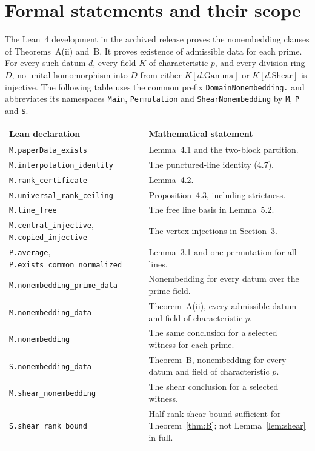 \documentclass[11pt,a4paper]{article}
\numberwithin{equation}{section}
\begin{document}
\appendix
\section{Formal statements and their scope}

The Lean~4 development in the archived release \cite{r18} proves the
nonembedding clauses of Theorems~A(ii) and~B. It proves existence of
admissible data for each prime. For every such datum $d$, every field $K$
of characteristic $p$, and every division ring $D$, no unital homomorphism
into $D$ from either $K[d.\mathrm{Gamma}]$ or $K[d.\mathrm{Shear}]$ is
injective. The following table uses the common prefix
\texttt{DomainNonembedding.} and abbreviates its namespaces
\texttt{Main}, \texttt{Permutation} and \texttt{ShearNonembedding} by
\texttt{M}, \texttt{P} and \texttt{S}.

\begin{center}
\begingroup
\small
\setlength{\tabcolsep}{0pt}
\begin{tabular}{@{}p{.425\linewidth}@{\hspace{.015\linewidth}}p{.55\linewidth}@{}}
\textbf{Lean declaration} & \textbf{Mathematical statement}\\
\hline
\texttt{M.paperData\_exists}
  & Lemma~4.1 and the two-block partition.\\
\texttt{M.interpolation\_identity}
  & The punctured-line identity (4.7).\\
\texttt{M.rank\_certificate}
  & Lemma~4.2.\\
\texttt{M.universal\_rank\_ceiling}
  & Proposition~4.3, including strictness.\\
\texttt{M.line\_free}
  & The free line basis in Lemma~5.2.\\
\texttt{M.central\_injective},\newline
\texttt{M.copied\_injective}
  & The vertex injections in Section~3.\\
\texttt{P.average},\newline
\texttt{P.exists\_common\_normalized}
  & Lemma~3.1 and one permutation for all lines.\\
\texttt{M.nonembedding\_prime\_data}
  & Nonembedding for every datum over the prime field.\\
\texttt{M.nonembedding\_data}
  & Theorem~A(ii), every admissible datum and field of characteristic $p$.\\
\texttt{M.nonembedding}
  & The same conclusion for a selected witness for each prime.\\
\texttt{S.nonembedding\_data}
  & Theorem~B, nonembedding for every datum and field of characteristic $p$.\\
\texttt{M.shear\_nonembedding}
  & The shear conclusion for a selected witness.\\
\texttt{S.shear\_rank\_bound}
  & Half-rank shear bound sufficient for Theorem~\ref{thm:B}; not Lemma~\ref{lem:shear} in full.
\end{tabular}
\endgroup
\end{center}
\end{document}
